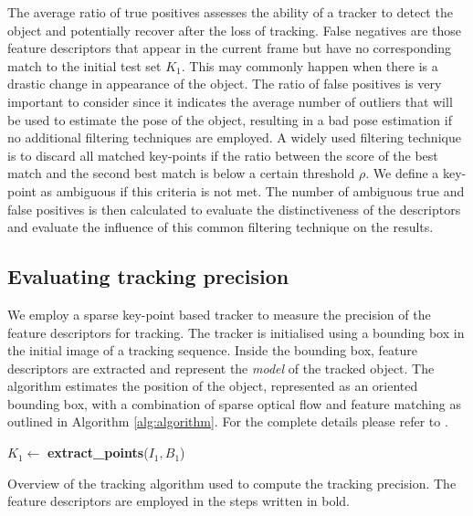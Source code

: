 The average ratio of true positives assesses the ability of a tracker to detect the object and potentially recover after the loss of tracking. False negatives are those feature descriptors that appear in the current frame but have no corresponding match to the initial test set $K_{1}$. This may commonly happen when there is a drastic change in appearance of the object. The ratio of false positives is very important to consider since it indicates the average number of outliers that will be used to estimate the pose of the object, resulting in a bad pose estimation if no additional filtering techniques are employed. A widely used filtering technique is to discard all matched key-points if the ratio between the score of the best match and the second best match is below a certain threshold $\rho$. We define a key-point as ambiguous if this criteria is not met. The  number of ambiguous true and false positives is then calculated to evaluate the distinctiveness of the descriptors and evaluate the influence of this common filtering technique on the results.

\subsection{Evaluating tracking precision}
\label{sec:accuracy}

We employ a sparse key-point based tracker to measure the precision of the feature descriptors for tracking. The tracker is initialised using a bounding box in the initial image of a tracking sequence. Inside the bounding box, feature descriptors are extracted and represent the \textit{model} of the tracked object. The algorithm estimates the position of the object, represented as an oriented bounding box, with a combination of sparse optical flow and feature matching as outlined in Algorithm \ref{alg:algorithm}. For the complete details please refer to \cite{pieropan15}.

\begin{algorithm}[!htb]
 $K_{1} \gets$ \textbf{extract\_points}($I_{1},B_1$)\;
 \caption{\label{alg:algorithm}Overview of the tracking algorithm used to compute the tracking precision. The feature descriptors are employed in the steps written in bold. }
\end{algorithm}


